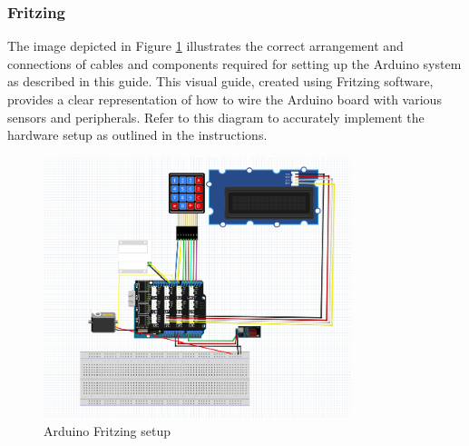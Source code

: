 \newpage
\subsubsection{Fritzing}\label{sec:ArduinoFritzing}
The image depicted in Figure \ref{fig:ardFritzing} illustrates the correct arrangement and connections of cables and components required for setting up the Arduino system as described in this guide. 
This visual guide, created using Fritzing software, provides a clear representation of how to wire the Arduino board with various sensors and peripherals. 
Refer to this diagram to accurately implement the hardware setup as outlined in the instructions.   

\begin{figure}[h]
    \centering
    \includegraphics[width=0.8\textwidth]{images/Arduino/arduino_fritzing_curcuit.png}
    \caption{Arduino Fritzing setup}
    \label{fig:ardFritzing}
\end{figure}


